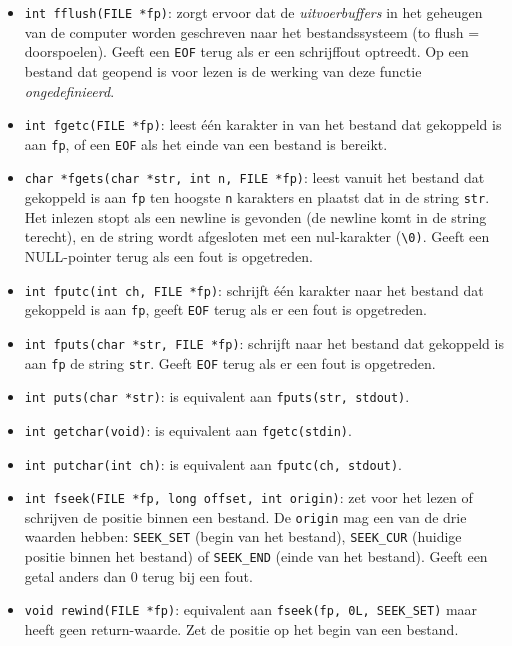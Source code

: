 \begin{itemize}[]
\item \texttt{int fflush(FILE *fp)}: zorgt ervoor dat de \textsl{uitvoerbuffers} in het geheugen van de computer worden geschreven naar het bestandssysteem (to flush = doorspoelen). Geeft een \texttt{EOF} terug als er een schrijffout optreedt. Op een bestand dat geopend is voor lezen is de werking van deze functie \textsl{ongedefinieerd}.
\item \texttt{int fgetc(FILE *fp)}: leest één karakter in van het bestand dat gekoppeld is aan \texttt{fp}, of een \texttt{EOF} als het einde van een bestand is bereikt.
\item \texttt{char *fgets(char *str, int n, FILE *fp)}: leest vanuit het bestand dat gekoppeld is aan \texttt{fp} ten hoogste \texttt{n} karakters en plaatst dat in de string \texttt{str}. Het inlezen stopt als een newline is gevonden (de newline komt in de string terecht), en de string wordt afgesloten met een nul-karakter (\texttt{\textquotesingle\textbackslash0\textquotesingle)}. Geeft een NULL-pointer terug als een fout is opgetreden.
\item \texttt{int fputc(int ch, FILE *fp)}: schrijft één karakter naar het bestand dat gekoppeld is aan \texttt{fp}, geeft \texttt{EOF} terug als er een fout is opgetreden.
\item \texttt{int fputs(char *str, FILE *fp)}: schrijft naar het bestand dat gekoppeld is aan \texttt{fp} de string \texttt{str}. Geeft \texttt{EOF} terug als er een fout is opgetreden.
\item \texttt{int puts(char *str)}: is equivalent aan \texttt{fputs(str, stdout)}.
\item \texttt{int getchar(void)}: is equivalent aan \texttt{fgetc(stdin)}.
\item \texttt{int putchar(int ch)}: is equivalent aan \texttt{fputc(ch, stdout)}.
\item \texttt{int fseek(FILE *fp, long offset, int origin)}: zet voor het lezen of schrijven de positie binnen een bestand. De \texttt{origin} mag een van de drie waarden hebben: \texttt{SEEK\_SET} (begin van het bestand), \texttt{SEEK\_CUR} (huidige positie binnen het bestand) of \texttt{SEEK\_END} (einde van het bestand). Geeft een getal anders dan 0 terug bij een fout.
\item \texttt{void rewind(FILE *fp)}: equivalent aan \texttt{fseek(fp, 0L, SEEK\_SET)} maar heeft geen return-waarde. Zet de positie op het begin van een bestand.
\end{itemize}

